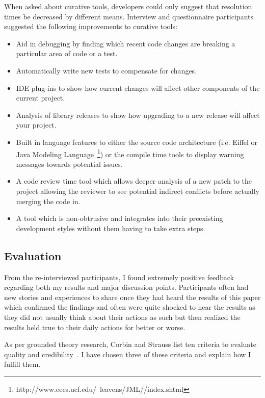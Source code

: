When asked about curative tools, developers could only suggest that resolution times be decreased by different means.
Interview and questionnaire participants suggested the following improvements to curative tools:

\begin{itemize}
        \item Aid in debugging by finding which recent code changes are breaking a particular area of code or a test.
        \item Automatically write new tests to compensate for changes.
        \item IDE plug-ins to show how current changes will affect other components of the current project.
        \item Analysis of library releases to show how upgrading to a new release will affect your project.
        \item Built in language features to either the source code architecture (i.e. Eiffel or 
                                Java Modeling Language~\footnote{http://www.eecs.ucf.edu/~leavens/JML//index.shtml}) or the compile 
                                time tools to display warning messages towards potential issues.
        \item A code review time tool which allows deeper analysis of a new patch to the project allowing the reviewer to see potential 
                                indirect conflicts before actually merging the code in.
        \item A tool which is non-obtrusive and integrates into their preexisting development styles without them having to take extra steps.
\end{itemize}

\subsection{Evaluation}
\label{sec:exp-eval}

From the re-interviewed participants, I found extremely positive feedback regarding both my results and major discussion
points. Participants often had new stories and experiences to share once they had heard the results of this paper which
confirmed the findings and often were quite shocked to hear the results as they did not usually think about their actions
as such but then realized the results held true to their daily actions for better or worse.

As per grounded theory research, Corbin and Strauss list ten criteria to evaluate quality and credibility~\cite{Corbin:1998:SP}.
I have chosen three of these criteria and explain how I fulfill them.

